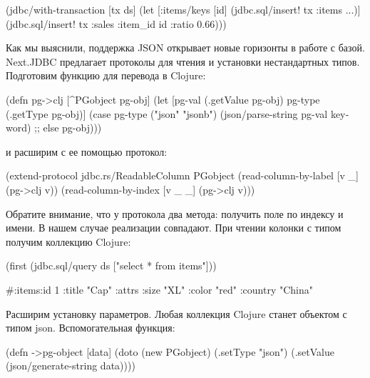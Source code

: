\begin{english}
  \begin{clojure}
(jdbc/with-transaction [tx ds]
  (let [{:items/keys [id]}
        (jdbc.sql/insert! tx :items {...})]
    (jdbc.sql/insert!
       tx
       :sales
       {:item_id id :ratio 0.66})))
  \end{clojure}
\end{english}

Как мы выяснили, поддержка JSON открывает новые горизонты в работе с базой. Next.JDBC предлагает протоколы для чтения и установки нестандартных типов. Подготовим функцию для перевода  в Clojure:

\begin{english}
  \begin{clojure}
(defn pg->clj [^PGobject pg-obj]
  (let [pg-val (.getValue pg-obj)
        pg-type (.getType pg-obj)]
    (case pg-type
      ("json" "jsonb")
      (json/parse-string pg-val keyword)
      ;; else
      pg-obj)))
  \end{clojure}
\end{english}

\noindent
и расширим с ее помощью протокол:

\begin{english}
  \begin{clojure}
(extend-protocol jdbc.rs/ReadableColumn
  PGobject
  (read-column-by-label [v _]
    (pg->clj v))
  (read-column-by-index [v _ _]
    (pg->clj v)))
  \end{clojure}
\end{english}

Обратите внимание, что у протокола два метода: получить поле по индексу и имени. В нашем случае реализации совпадают. При чтении колонки с типом  получим коллекцию Clojure:

\begin{english}
  \begin{clojure}
(first (jdbc.sql/query ds ["select * from items"]))

#:items{:id 1
        :title "Cap"
        :attrs {:size "XL"
                :color "red"
                :country "China"}}
  \end{clojure}
\end{english}

Расширим установку параметров. Любая коллекция Clojure станет объектом  с типом json. Вспомогательная функция:

\begin{english}
  \begin{clojure}
(defn ->pg-object [data]
  (doto (new PGobject)
    (.setType "json")
    (.setValue (json/generate-string data))))
  \end{clojure}
\end{english}

